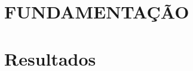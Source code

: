\documentclass[
	12pt,				  %
  oneside,			%
	a4paper,			%
	english,			%
	french,				%
	spanish,			%
	brazil,				%
	]{abntex2}
\begin{document}
  
  \frenchspacing 
  
  
  \imprimircapa

  \imprimirfolhaderosto*
  
%  
 
  

  
  
  
  
  

  
  \tableofcontents*
  \cleardoublepage

  \textual
  
  
  
  \part{FUNDAMENTAÇÃO}
  
  
  
  \part{Resultados}
  
\end{document}
